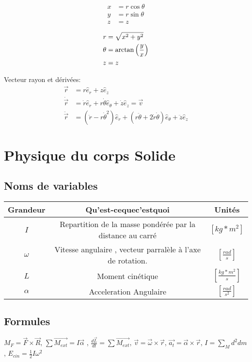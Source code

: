 \documentclass[10pt,a4paper]{article}
\begin{document}
\begin{multicols}{3}


\begin{align*}
x &= r  \cos\theta \\
y &= r  \sin\theta \\
z &= z
\end{align*}

\columnbreak



\columnbreak

\begin{align*}
r & = \sqrt{x^2 + y^2}\\
\theta & = \arctan\left({y \over x}\right) \\
z & = z
\end{align*}

\end{multicols}

Vecteur rayon et dérivées:
\begin{align*}
\vec{r} &= r \hat e_r + z\hat e_z \\
\dot{\vec{r}} &= \dot r \hat e_r + r \dot\theta\hat e_\theta + \dot z \hat e_z = \vec{v} \\
\ddot{\vec{r}} &= \left(\ddot r - r\dot\theta^2 \right)\hat e_r 
+ \left( r\ddot\theta + 2\dot r \dot \theta \right) \hat e_\theta + \ddot z \hat e_z 
\end{align*}


\section{Physique du corps Solide}

\subsection{Noms de variables}

\begin{tabular}{|c|c|c|}
\hline 
Grandeur & Qu'est-cequec'estquoi & Unités \\ 
\hline 
$I$ & Repartition de la masse pondérée par la distance au carré & $[kg*m^2]$ \\ 
\hline
$\omega$ & Vitesse angulaire , vecteur parralèle à l'axe de rotation. & $[\frac{rad}{s}]$ \\ 
\hline
$L$ & Moment cinétique & $[\frac{kg*m^2}{s}]$ \\
\hline
$\alpha$ & Acceleration Angulaire & $[\frac{rad}{s^2}]$ \\
\hline
\end{tabular}

\subsection{Formules}
$M_F = \vec F \times \vec R$,
$\sum \vec{M_{ext}} = I\vec{\alpha}$ ,
$\frac{d\vec{L}}{dt} = \sum \vec{M_{ext}}$,
$\vec{v} = \vec{\omega} \times \vec{r}$,
$\vec{a_t} = \vec{\alpha} \times \vec{r}$,
$I = \sum \limits_M d^2 dm$,
$E_{cin} = \frac{1}{2}I\omega^2$
\end{document}
